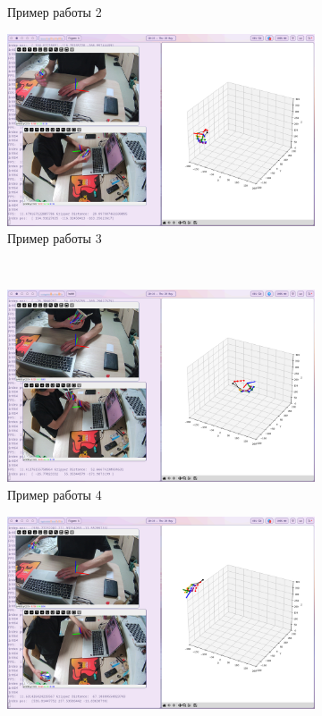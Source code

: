 \documentclass[12pt, a4paper]{article}
\begin{document}
\begin{figure}[!ht]
\begin{subfigure}{0.45\textwidth}
      \caption{Пример работы 2}
    \end{subfigure}
    \hfill
    \begin{subfigure}{0.45\textwidth}
      \centering
      \includegraphics[width=\linewidth]{images/final_version_working/pose-3.png}
      \caption{Пример работы 3}
    \end{subfigure}
    \\
    \begin{subfigure}{0.45\textwidth}
      \centering
      \includegraphics[width=\linewidth]{images/final_version_working/pose-4.png}
      \caption{Пример работы 4}
    \end{subfigure}
    \hfill
    \begin{subfigure}{0.45\textwidth}
      \centering
      \includegraphics[width=\linewidth]{images/final_version_working/pose-5.png}

\end{subfigure}
\end{figure}
\end{document}
